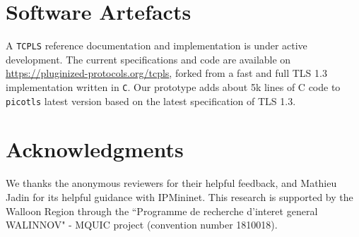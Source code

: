 %


\section*{Software Artefacts}

A \texttt{TCPLS} reference documentation and implementation is under active development. The
current specifications and code are available on
\url{https://pluginized-protocols.org/tcpls}, forked from a fast and
full TLS 1.3 implementation written in \texttt{C}. Our \tcpls prototype adds
about 5k lines of C code to \texttt{picotls} latest version based on the latest
specification of TLS 1.3.

\section*{Acknowledgments}
We thanks the anonymous reviewers for their helpful feedback, and Mathieu Jadin
for its helpful guidance with IPMininet. This research is supported by the Walloon
Region through the ``Programme de recherche d'interet general
 WALINNOV" - MQUIC project (convention number 1810018).

